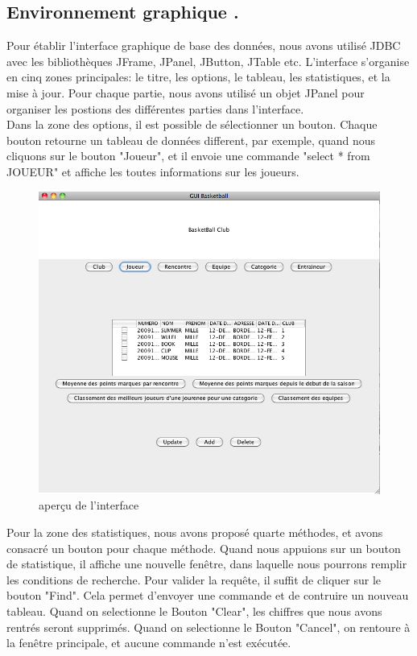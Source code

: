\documentclass{article}
\begin{document}
\subsection{Environnement graphique
.}

Pour établir l'interface graphique de base des données, nous avons utilisé JDBC avec les bibliothèques JFrame, JPanel, JButton, JTable etc. L'interface s'organise en cinq zones principales: le titre, les options, le tableau, les statistiques, et la mise à jour. Pour chaque partie, nous avons utilisé un objet JPanel pour organiser les postions des différentes parties dans l'interface. \\

Dans la zone des options, il est possible de sélectionner un bouton. Chaque bouton retourne un tableau de données different, par exemple, quand nous cliquons sur le bouton "Joueur", et il envoie une commande "select * from JOUEUR" et affiche les toutes informations sur les joueurs. \\

\begin{figure}[!h]
\centering
\includegraphics[scale = 0.4] {1.png}
\caption{aperçu de l'interface}
\end{figure}

 \newpage
Pour la zone des statistiques, nous avons proposé quarte méthodes, et avons consacré un bouton pour chaque méthode. Quand nous appuions sur un bouton de statistique, il affiche une nouvelle fenêtre, dans laquelle nous pourrons remplir les conditions de recherche. Pour valider la requête, il suffit de cliquer sur le bouton "Find". Cela permet d'envoyer une commande et de contruire un nouveau tableau. Quand on selectionne le Bouton "Clear", les chiffres que nous avons rentrés seront supprimés. Quand on selectionne le Bouton "Cancel", on rentoure à la fenêtre principale, et aucune commande n'est exécutée. \\
 
\end{document}
